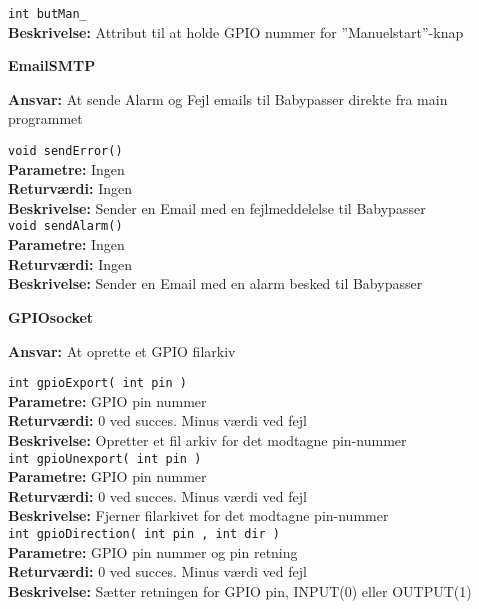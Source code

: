 \verb+int butMan_ +\\
\textbf{Beskrivelse:} Attribut til at holde GPIO nummer for ''Manuelstart''-knap \\

{\centering
\textbf{EmailSMTP}\par
}
\textbf{Ansvar:} At sende Alarm og Fejl emails til Babypasser direkte fra main programmet \

\verb+void sendError() +\\
\textbf{Parametre:}   Ingen \\
\textbf{Returværdi:}  Ingen \\
\textbf{Beskrivelse:} Sender en Email med en fejlmeddelelse til Babypasser \\

\verb+void sendAlarm() +\\
\textbf{Parametre:}   Ingen \\
\textbf{Returværdi:}  Ingen \\
\textbf{Beskrivelse:} Sender en Email med en alarm besked til Babypasser \\

{\centering
\textbf{GPIOsocket}\par
}
\textbf{Ansvar:} At oprette et GPIO filarkiv \

\verb+int gpioExport( int pin ) +\\
\textbf{Parametre:}   GPIO pin nummer \\
\textbf{Returværdi:}  0 ved succes. Minus værdi ved fejl \\
\textbf{Beskrivelse:} Opretter et fil arkiv for det modtagne pin-nummer \\

\verb+int gpioUnexport( int pin ) +\\
\textbf{Parametre:}   GPIO pin nummer \\
\textbf{Returværdi:}  0 ved succes. Minus værdi ved fejl \\
\textbf{Beskrivelse:} Fjerner filarkivet for det modtagne pin-nummer \\

\verb+int gpioDirection( int pin , int dir ) +\\
\textbf{Parametre:}   GPIO pin nummer og pin retning \\
\textbf{Returværdi:}  0 ved succes. Minus værdi ved fejl \\
\textbf{Beskrivelse:} Sætter retningen for GPIO pin, INPUT(0) eller OUTPUT(1) \\

